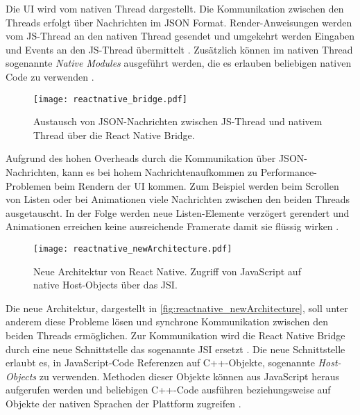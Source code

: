 Die \ac{UI} wird vom nativen Thread dargestellt.
Die Kommunikation zwischen den Threads erfolgt über Nachrichten im \ac{JSON} Format.
Render-Anweisungen werden vom JS-Thread an den nativen Thread gesendet und umgekehrt werden Eingaben und Events an den JS-Thread übermittelt \cite{ReactNative_newArchitecture,Dragomir_ReactNative}.
Zusätzlich können im nativen Thread sogenannte \textit{Native Modules} ausgeführt werden, die es erlauben beliebigen nativen Code zu verwenden \cite{ReactNative_TurboModules}.
\begin{figure}[ht]
  \centering
  \texttt{[image: reactnative\_bridge.pdf]}
  \caption{Austausch von JSON-Nachrichten zwischen JS-Thread und nativem Thread über die  React Native Bridge.}
  \label{fig:reactnative_bridge}
\end{figure}

Aufgrund des hohen Overheads durch die Kommunikation über \ac{JSON}-Nachrichten, kann es bei hohem Nachrichtenaufkommen zu Performance-Problemen beim Rendern der \ac{UI} kommen.
Zum Beispiel werden beim Scrollen von Listen oder bei Animationen viele Nachrichten zwischen den beiden Threads ausgetauscht.
In der Folge werden neue Listen-Elemente verzögert gerendert und Animationen erreichen keine ausreichende Framerate damit sie flüssig wirken \cite{Cook_ReactNativeBridge}.

\begin{figure}[ht]
  \centering
  \texttt{[image: reactnative\_newArchitecture.pdf]}
  \caption{Neue Architektur von React Native. Zugriff von JavaScript auf native Host-Objects über das \ac{JSI}.}
  \label{fig:reactnative_newArchitecture}
\end{figure}

Die neue Architektur, dargestellt in \autoref{fig:reactnative_newArchitecture}, soll unter anderem diese Probleme lösen und synchrone Kommunikation zwischen den beiden Threads ermöglichen.
Zur Kommunikation wird die React Native Bridge durch eine neue Schnittstelle das sogenannte \ac{JSI} ersetzt \cite{Cook_ReactNativeBridge}.
Die neue Schnittstelle erlaubt es, in JavaScript-Code Referenzen auf C++-Objekte, sogenannte \textit{Host-Objects} zu verwenden.
Methoden dieser Objekte können aus JavaScript heraus aufgerufen werden und beliebigen C++-Code ausführen beziehungsweise auf Objekte der nativen Sprachen der Plattform zugreifen \cite{Parashuram_React}.

